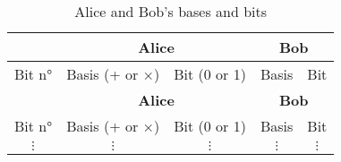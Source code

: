 \begin{longtable}{c|cc|cc}
    \caption{Alice and Bob's bases and bits}
    \label{tab:aeb}\\
    \toprule
          & \multicolumn{2}{c|}{\textbf{Alice}} & \multicolumn{2}{c}{\textbf{Bob}}                  \\
    \midrule
    Bit n° & Basis (+ or $\times$)      & Bit (0 or 1)            & Basis    & Bit \\ \hline
  
    \endfirsthead %
  
    \toprule
          & \multicolumn{2}{c|}{\textbf{Alice}} & \multicolumn{2}{c}{\textbf{Bob}}                  \\
    \midrule
    Bit n° & Basis (+ or $\times$)      & Bit (0 or 1)            & Basis    & Bit \\ \hline
    $\vdots$ & $\vdots$                 & $\vdots$                & $\vdots$ & $\vdots$ \\
  

\end{longtable}
